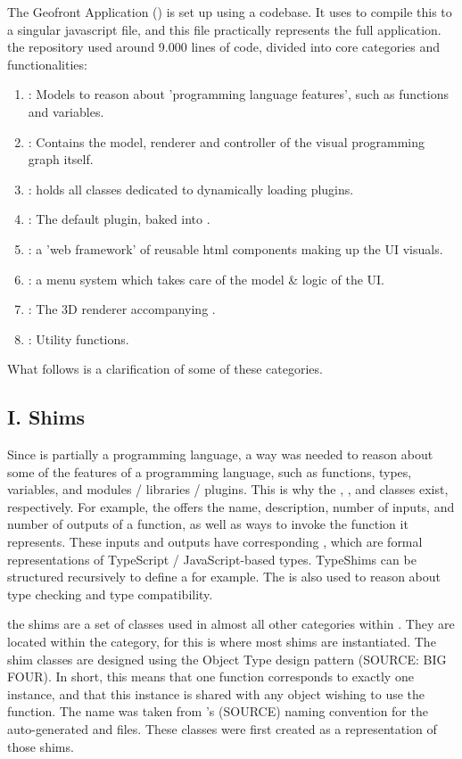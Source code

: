 The Geofront Application () is set up using a  codebase. It uses  to compile this to a singular javascript file, and this file practically represents the full application. 
the repository used around 9.000 lines of code, divided into core categories and functionalities:
\begin{enumerate}[I]
  \item {}: Models to reason about 'programming language features', such as functions and variables.
  \item {}: Contains the model, renderer and controller of the visual programming graph itself.  
  \item {}: holds all classes dedicated to dynamically loading plugins.
  \item {}: The default plugin, baked into \geofront{}.   
  \item {}: a 'web framework' of reusable html components making up the UI visuals.
  \item {}: a menu system which takes care of the model \& logic of the UI.
  \item {}: The 3D renderer accompanying \geofront{}.
  \item {}: Utility functions.   
\end{enumerate}
What follows is a clarification of some of these categories.

\subsection*{I. Shims}

Since \geofront{} is partially a programming language, a way was needed to reason about some of the features of a programming language, such as functions, types, variables, and modules / libraries / plugins. 
This is why the , ,  and  classes exist, respectively. 
For example, the  offers the name, description, number of inputs, and number of outputs of a function, as well as ways to invoke the function it represents.
These inputs and outputs have corresponding , which are formal representations of TypeScript / JavaScript-based types. TypeShims can be structured recursively to define a  for example. The  is also used to reason about type checking and type compatibility.

the shims are a set of classes used in almost all other categories within \geofront{}. They are located within the  category, for this is where most shims are instantiated.
The shim classes are designed using the Object Type design pattern (SOURCE: BIG FOUR). In short, this means that one function corresponds to exactly one  instance, and that this instance is shared with any object wishing to use the function. 
The name  was taken from 's (SOURCE) naming convention for the auto-generated  and  files. These classes were first created as a representation of those shims.


